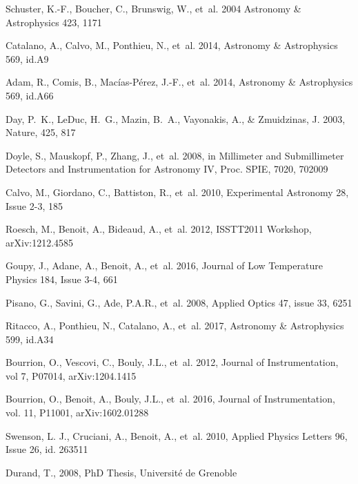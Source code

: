 \begin{thebibliography}{99}
Schuster, K.-F., Boucher, C., Brunswig, W., {et~al.} 2004 
Astronomy \& Astrophysics 423, 1171

Catalano, A., Calvo, M., Ponthieu, N., {et~al.} 2014, 
Astronomy \& Astrophysics 569, id.A9

Adam, R., Comis, B., Mac\'ias-P\'erez, J.-F., {et~al.} 2014, 
Astronomy \& Astrophysics 569, id.A66

Day, P.~K., LeDuc, H.~G., Mazin, B.~A., Vayonakis, A., \& Zmuidzinas, J. 2003,
  Nature, 425, 817

Doyle, S., Mauskopf, P., Zhang, J., {et~al.} 2008{}, in Millimeter
  and Submillimeter Detectors and Instrumentation for Astronomy IV, Proc. SPIE,
  7020, 702009

Calvo, M., Giordano, C., Battiston, R., {et~al.} 2010, 
Experimental Astronomy 28, Issue 2-3, 185

Roesch, M., Benoit, A., Bideaud, A., {et~al.} 2012, 
ISSTT2011 Workshop, arXiv:1212.4585

Goupy, J., Adane, A., Benoit, A., {et~al.} 2016, 
Journal of Low Temperature Physics 184, Issue 3-4, 661

Pisano, G., Savini, G., Ade, P.A.R., {et~al.} 2008, 
Applied Optics 47, issue 33, 6251

Ritacco, A., Ponthieu, N., Catalano, A., {et~al.} 2017, 
Astronomy \& Astrophysics 599, id.A34

Bourrion, O., Vescovi, C., Bouly, J.L., {et~al.} 2012, 
Journal of Instrumentation, vol 7, P07014, arXiv:1204.1415

Bourrion, O., Benoit, A., Bouly, J.L., {et~al.} 2016, 
Journal of Instrumentation, vol. 11, P11001, arXiv:1602.01288

Swenson, L. J., Cruciani, A., Benoit, A., {et~al.} 2010, 
Applied Physics Letters 96, Issue 26, id. 263511

Durand, T., 2008, 
PhD Thesis, Universit\' e de Grenoble


\end{thebibliography}

